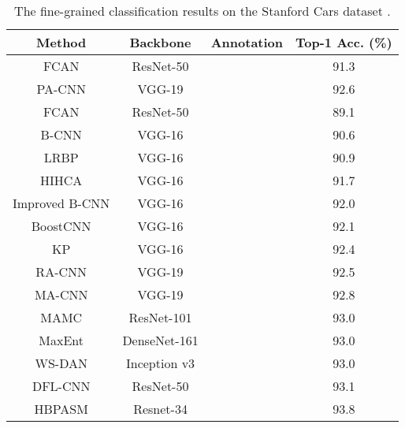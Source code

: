 \documentclass[10pt,twocolumn,letterpaper]{article}
\begin{document}
\begin{table}[t]
    \centering
    \small{ \setlength{\tabcolsep}{1.0pt}
    \caption{The fine-grained classification results on the Stanford Cars dataset \cite{DBLP:conf/iccvw/Krause0DF13}.}
    \vspace{-2mm}
    \label{tab:cars}    
    \begin{tabular}{cccc}
    	\toprule
    	                    Method                      &   Backbone   & Annotation & Top-1 Acc. (\%) \\ \midrule
    	    FCAN \cite{DBLP:journals/corr/LiuXWL16}     &  ResNet-50   & \checkmark &      91.3       \\
    	   PA-CNN \cite{DBLP:conf/cvpr/KrauseJYL15}     &    VGG-19    & \checkmark &      92.6       \\ \midrule
    	    FCAN \cite{DBLP:journals/corr/LiuXWL16}     &  ResNet-50   &    &      89.1       \\
    	      B-CNN \cite{DBLP:conf/iccv/LinRM15}       &    VGG-16    &    &      90.6       \\
    	    LRBP \cite{DBLP:journals/corr/KongF16}      &    VGG-16    &    &      90.9       \\
    	      HIHCA \cite{DBLP:conf/iccv/CaiZZ17}       &    VGG-16    &    &      91.7       \\
    	  Improved B-CNN \cite{DBLP:conf/bmvc/LinM17}   &    VGG-16    &    &      92.0       \\
    	 BoostCNN \cite{DBLP:conf/bmvc/MoghimiBSYVL16}  &    VGG-16    &    &      92.1       \\
    	      KP \cite{DBLP:conf/cvpr/CuiZWLLB17}       &    VGG-16    &    &      92.4       \\
    	      RA-CNN \cite{DBLP:conf/cvpr/FuZM17}       &    VGG-19    &    &      92.5       \\
    	    MA-CNN \cite{DBLP:conf/iccv/ZhengFML17}     &    VGG-19    &    &      92.8       \\
    	      MAMC \cite{DBLP:conf/eccv/SunYZD18}       &  ResNet-101  &    &      93.0       \\
    	    MaxEnt \cite{DBLP:conf/nips/DubeyGRN18}     & DenseNet-161 &    &      93.0       \\
    	WS-DAN \cite{DBLP:journals/corr/abs-1901-09891} & Inception v3 &    &      93.0       \\
    	    DFL-CNN \cite{DBLP:conf/cvpr/WangMD18}      &  ResNet-50   &    &      93.1       \\
    	             HBPASM \cite{8805063}              &  Resnet-34   &    &      93.8       \\

\end{tabular}}
\end{table}
\end{document}
